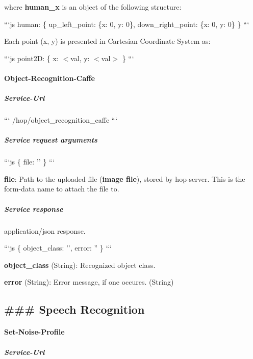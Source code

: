 where {\bfseries human\-\_\-x} is an object of the following structure\-:

```js human\-: \{ up\-\_\-left\-\_\-point\-: \{x\-: 0, y\-: 0\}, down\-\_\-right\-\_\-point\-: \{x\-: 0, y\-: 0\} \} ```

Each point (x, y) is presented in Cartesian Coordinate System as\-:

```js point2\-D\-: \{ x\-: $<$val, y\-: $<$val$>$ \} ```

\paragraph*{Object-\/\-Recognition-\/\-Caffe}

\subparagraph*{Service-\/\-Url}

``` /hop/object\-\_\-recognition\-\_\-caffe ```

\subparagraph*{Service request arguments}

```js \{ file\-: '' \} ```


\begin{DoxyItemize}
\item {\bfseries file}\-: Path to the uploaded file ({\bfseries image file}), stored by hop-\/server. This is the form-\/data name to attach the file to.
\end{DoxyItemize}

\subparagraph*{Service response}

application/json response.

```js \{ object\-\_\-class\-: '', error\-: '' \} ```


\begin{DoxyItemize}
\item {\bfseries object\-\_\-class} (String)\-: Recognized object class.
\item {\bfseries error} (String)\-: Error message, if one occures. (String)
\end{DoxyItemize}



 \subsection*{\#\#\# Speech Recognition }

\paragraph*{Set-\/\-Noise-\/\-Profile}

\subparagraph*{Service-\/\-Url}

